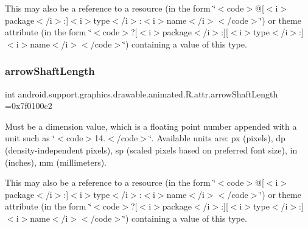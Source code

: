 This may also be a reference to a resource (in the form \char`\"{}$<$code$>$@\mbox{[}$<$i$>$package$<$/i$>$\+:\mbox{]}$<$i$>$type$<$/i$>$\+:$<$i$>$name$<$/i$>$$<$/code$>$\char`\"{}) or theme attribute (in the form \char`\"{}$<$code$>$?\mbox{[}$<$i$>$package$<$/i$>$\+:\mbox{]}\mbox{[}$<$i$>$type$<$/i$>$\+:\mbox{]}$<$i$>$name$<$/i$>$$<$/code$>$\char`\"{}) containing a value of this type. \mbox{\label{classandroid_1_1support_1_1graphics_1_1drawable_1_1animated_1_1R_1_1attr_aedbccbc4f877b1f5c43b9e63c0863fdd}} 
\subsubsection{\texorpdfstring{arrow\+Shaft\+Length}{arrowShaftLength}}
{\footnotesize\ttfamily int android.\+support.\+graphics.\+drawable.\+animated.\+R.\+attr.\+arrow\+Shaft\+Length =0x7f0100c2\hspace{0.3cm}{\ttfamily [static]}}

Must be a dimension value, which is a floating point number appended with a unit such as \char`\"{}$<$code$>$14.\+5sp$<$/code$>$\char`\"{}. Available units are\+: px (pixels), dp (density-\/independent pixels), sp (scaled pixels based on preferred font size), in (inches), mm (millimeters). 

This may also be a reference to a resource (in the form \char`\"{}$<$code$>$@\mbox{[}$<$i$>$package$<$/i$>$\+:\mbox{]}$<$i$>$type$<$/i$>$\+:$<$i$>$name$<$/i$>$$<$/code$>$\char`\"{}) or theme attribute (in the form \char`\"{}$<$code$>$?\mbox{[}$<$i$>$package$<$/i$>$\+:\mbox{]}\mbox{[}$<$i$>$type$<$/i$>$\+:\mbox{]}$<$i$>$name$<$/i$>$$<$/code$>$\char`\"{}) containing a value of this type. \mbox{\label{classandroid_1_1support_1_1graphics_1_1drawable_1_1animated_1_1R_1_1attr_a48243332e0c9853fda9dd7bb0156918d}} 

